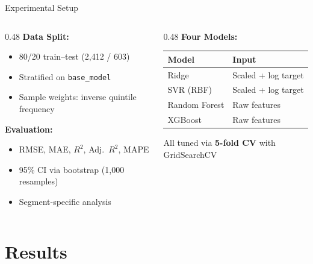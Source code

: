 \documentclass[aspectratio=169]{beamer}
\begin{document}
\begin{frame}{Experimental Setup}
  \begin{columns}[T]
    \begin{column}{0.48\textwidth}
      \textbf{Data Split:}
      \begin{itemize}
        \item 80/20 train--test (2,412 / 603)
        \item Stratified on \texttt{base\_model}
        \item Sample weights: inverse quintile frequency
      \end{itemize}

      \vspace{1em}
      \textbf{Evaluation:}
      \begin{itemize}
        \item RMSE, MAE, $R^2$, Adj.\ $R^2$, MAPE
        \item 95\% CI via bootstrap (1,000 resamples)
        \item Segment-specific analysis
      \end{itemize}
    \end{column}
    \begin{column}{0.48\textwidth}
      \textbf{Four Models:}
      \vspace{0.5em}
      \small
      \begin{tabular}{ll}
        \toprule
        \textbf{Model} & \textbf{Input} \\
        \midrule
        Ridge & Scaled + log target \\
        SVR (RBF) & Scaled + log target \\
        Random Forest & Raw features \\
        XGBoost & Raw features \\
        \bottomrule
      \end{tabular}

      \vspace{1em}
      \normalsize
      All tuned via \textbf{5-fold CV} with GridSearchCV
    \end{column}
  \end{columns}
\end{frame}

\section{Results}
\end{document}
